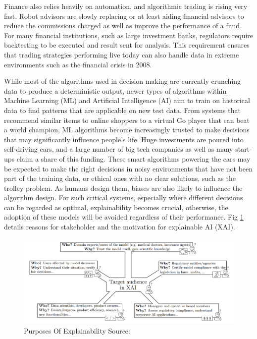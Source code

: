 \documentclass[proposal]{softeng}
\begin{document}
    Finance also relies heavily on automation, and algorithmic trading is rising very fast. Robot advisors are slowly replacing or at least aiding financial advisors to reduce the commissions charged as well as improve the performance of a fund\cite{robot}. For many financial institutions, such as large investment banks, regulators require backtesting to be executed and result sent for analysis\cite{backtesting}. This requirement ensures that trading strategies performing live today can also handle data in extreme environments such as the financial crisis in 2008.

    While most of the algorithms used in decision making are currently crunching data to produce a deterministic output, newer types of algorithms within Machine Learning (ML) and Artificial Intelligence (AI) aim to train on historical data to find patterns that are applicable on new test data. From systems that recommend similar items to online shoppers to a virtual Go player that can beat a world champion\cite{alphago}, ML algorithms become increasingly trusted to make decisions that may significantly influence people's life. Huge investments are poured into self-driving cars, and a large number of big tech companies as well as many start-ups\cite{autonomous} claim a share of this funding. These smart algorithms powering the cars may be expected to make the right decisions in noisy environments that have not been part of the training data, or ethical ones with no clear solutions, such as the trolley problem\cite{trolley}. As humans design them, biases are also likely to influence the algorithm design. For such critical systems, especially where different decisions can be regarded as optimal, explainability becomes crucial, otherwise, the adoption of these models will be avoided regardless of their performance. Fig \ref{fig:purposes_of_explainability} details reasons for stakeholder and the motivation for explainable AI (XAI).

    \begin{figure}[h!]
        \centering

        \includegraphics[width=.9\textwidth]{images/purposes_of_explainability.png}

        \caption{Purposes Of Explainability Source:\cite{BarredoArrietaAlejandro2020EAIX}}

        \label{fig:purposes_of_explainability}
    \end{figure}
\end{document}
